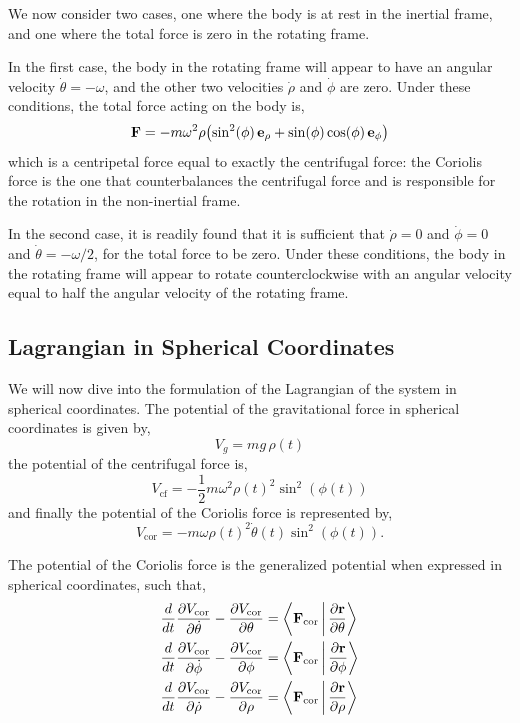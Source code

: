 \documentclass[12pt]{article}
\begin{document}
We now consider two cases, one where the body is at rest in the inertial frame, and one where
the total force is zero in the rotating frame.

In the first case, the body in the rotating frame will appear to have an angular velocity
$\dot\theta = -\omega$, and the other two velocities $\dot\rho$ and $\dot\phi$ are zero.
Under these conditions, the total force acting on the body is,
\begin{equation}
  \vb{F} = -m\omega^2\rho\bigl(\sin^2(\phi)\,\vb{e}_\rho + \sin(\phi)\cos(\phi)\,\vb{e}_\phi\bigr)
\end{equation}
which is a centripetal force equal to exactly the centrifugal force: the Coriolis force is the
one that counterbalances the centrifugal force and is responsible for the rotation in the
non-inertial frame.

In the second case, it is readily found that it is sufficient that $\dot\rho = 0$ and
$\dot\phi = 0$ and $\dot\theta = -\omega/2$, for the total force to be zero. Under these
conditions, the body in the rotating frame will appear to rotate counterclockwise with an
angular velocity equal to half the angular velocity of the rotating frame.

\subsection{Lagrangian in Spherical Coordinates}

We will now dive into the formulation of the Lagrangian of the system in spherical
coordinates. The potential of the gravitational force in spherical coordinates is given by,
\begin{equation}
  V_g = mg\,\rho(t)
\end{equation}
the potential of the centrifugal force is,
\begin{equation}
  V_\text{cf} = -\frac{1}{2}m\omega^2\rho(t)^2\sin^2(\phi(t))
\end{equation}
and finally the potential of the Coriolis force is represented by,
\begin{equation}
  V_\text{cor} = -m\omega\rho(t)^2\dot\theta(t)\sin^2(\phi(t)).
\end{equation}

The potential of the Coriolis force is the generalized potential when expressed in spherical
coordinates, such that,
\begin{align}
  \frac{d}{dt}\frac{\partial V_\text{cor}}{\partial\dot\theta}
    - \frac{\partial V_\text{cor}}{\partial\theta}
    &= \left\langle\vb{F}_\text{cor}\,\middle|\,\frac{\partial\vb{r}}{\partial\theta}\right\rangle \\
  \frac{d}{dt}\frac{\partial V_\text{cor}}{\partial\dot\phi}
    - \frac{\partial V_\text{cor}}{\partial\phi}
    &= \left\langle\vb{F}_\text{cor}\,\middle|\,\frac{\partial\vb{r}}{\partial\phi}\right\rangle \\
  \frac{d}{dt}\frac{\partial V_\text{cor}}{\partial\dot\rho}
    - \frac{\partial V_\text{cor}}{\partial\rho}
    &= \left\langle\vb{F}_\text{cor}\,\middle|\,\frac{\partial\vb{r}}{\partial\rho}\right\rangle
\end{align}
\end{document}
